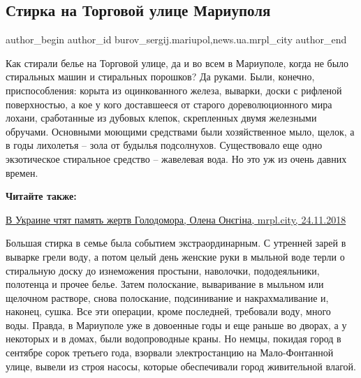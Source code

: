  
 
 
 
 
 
\subsection{Стирка на Торговой улице Мариуполя}
\label{sec:24_11_2018.stz.news.ua.mrpl_city.1.stirka_na_torgovoj_ulice_mariupolja}
 
\ifcmt
 author_begin
   author_id burov_sergij.mariupol,news.ua.mrpl_city
 author_end
\fi


Как стирали белье на Торговой улице, да и во всем в Мариуполе, когда не было
стиральных машин и стиральных порошков? Да руками. Были, конечно,
приспособления: корыта из оцинкованного железа, выварки, доски с рифленой
поверхностью, а кое у кого доставшееся от старого дореволюционного мира лохани,
сработанные из дубовых клепок, скрепленных двумя железными обручами. Основными
моющими средствами были хозяйственное мыло, щелок, а в годы лихолетья – зола от
будылья подсолнухов. Существовало еще одно экзотическое стиральное средство –
жавелевая вода. Но это уж из очень давних времен.

\textbf{Читайте также:} 

\href{https://mrpl.city/news/view/v-ukraine-chtyat-pamyat-zhertv-golodomora-video}{%
В Украине чтят память жертв Голодомора, Олена Онєгіна, mrpl.city, 24.11.2018}

 Большая стирка в семье была событием экстраординарным. С утренней зарей в
выварке грели воду, а потом целый день женские руки в мыльной воде терли о
стиральную доску до изнеможения простыни, наволочки, пододеяльники, полотенца и
прочее белье. Затем полоскание, вываривание в мыльном или щелочном растворе,
снова полоскание, подсинивание и накрахмаливание и, наконец, сушка. Все эти
операции, кроме последней, требовали воду, много воды. Правда, в Мариуполе уже
в довоенные годы и еще раньше во дворах, а у некоторых и в домах, были
водопроводные краны. Но немцы, покидая город в сентябре сорок третьего года,
взорвали электростанцию на Мало-Фонтанной улице, вывели из строя насосы,
которые обеспечивали город живительной влагой.

